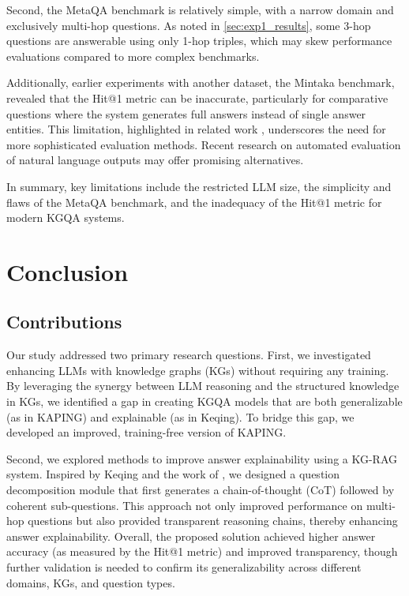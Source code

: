 \documentclass[pdflatex,sn-mathphys-num]{sn-jnl}%
\theoremstyle{thmstyleone}%
\theoremstyle{thmstyletwo}%
\theoremstyle{thmstylethree}%
\begin{document}
Second, the MetaQA benchmark is relatively simple, with a narrow domain and exclusively multi-hop questions. As noted in \autoref{sec:exp1_results}, some 3-hop questions are answerable using only 1-hop triples, which may skew performance evaluations compared to more complex benchmarks.

Additionally, earlier experiments with another dataset, the Mintaka benchmark, revealed that the Hit@1 metric can be inaccurate, particularly for comparative questions where the system generates full answers instead of single answer entities. This limitation, highlighted in related work \cite{Baek2023, Wu2023, Wang2023}, underscores the need for more sophisticated evaluation methods. Recent research on automated evaluation of natural language outputs \cite{Guo2023} may offer promising alternatives.

In summary, key limitations include the restricted LLM size, the simplicity and flaws of the MetaQA benchmark, and the inadequacy of the Hit@1 metric for modern KGQA systems.


\section{Conclusion}
\label{sec:conclusion}

\subsection{Contributions}
Our study addressed two primary research questions. First, we investigated enhancing LLMs with knowledge graphs (KGs) without requiring any training. By leveraging the synergy between LLM reasoning and the structured knowledge in KGs, we identified a gap in creating KGQA models that are both generalizable (as in KAPING) and explainable (as in Keqing). To bridge this gap, we developed an improved, training-free version of KAPING.

Second, we explored methods to improve answer explainability using a KG-RAG system. Inspired by Keqing \cite{Wang2023} and the work of \cite{Radha2023}, we designed a question decomposition module that first generates a chain-of-thought (CoT) followed by coherent sub-questions. This approach not only improved performance on multi-hop questions but also provided transparent reasoning chains, thereby enhancing answer explainability. Overall, the proposed solution achieved higher answer accuracy (as measured by the Hit@1 metric) and improved transparency, though further validation is needed to confirm its generalizability across different domains, KGs, and question types.
\end{document}
